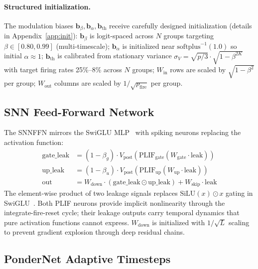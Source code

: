 \documentclass{article}
\newcommand{\vpost}{V_{\text{post}}}
\begin{document}
\paragraph{Structured initialization.}
The modulation biases $\mathbf{b}_\beta, \mathbf{b}_\alpha, \mathbf{b}_{\text{th}}$ receive carefully designed initialization (details in Appendix~\ref{app:init}):
$\mathbf{b}_\beta$ is logit-spaced across $N$ groups targeting $\beta \in [0.80, 0.99]$ (multi-timescale);
$\mathbf{b}_\alpha$ is initialized near $\text{softplus}^{-1}(1.0)$ so initial $\alpha \approx 1$;
$\mathbf{b}_{\text{th}}$ is calibrated from stationary variance $\sigma_V = \sqrt{p/3} \cdot \sqrt{1 - \beta^{2K}}$ with target firing rates 25\%--8\% across $N$ groups;
$W_{\text{in}}$ rows are scaled by $\sqrt{1 - \beta^2}$ per group;
$W_{\text{out}}$ columns are scaled by $1/\sqrt{p_{\text{fire}}}$ per group.

\subsection{SNN Feed-Forward Network}
\label{sec:snn-ffn}

The SNNFFN mirrors the SwiGLU MLP~\citep{touvron2023llama} with spiking neurons replacing the activation function:
\begin{align}
    \text{gate\_leak} &= (1-\beta_g) \cdot \vpost(\text{PLIF}_{\text{gate}}(W_{\text{gate}} \cdot \text{leak})) \label{eq:ffn-gate} \\
    \text{up\_leak} &= (1-\beta_u) \cdot \vpost(\text{PLIF}_{\text{up}}(W_{\text{up}} \cdot \text{leak})) \label{eq:ffn-up} \\
    \text{out} &= W_{\text{down}} \cdot (\text{gate\_leak} \odot \text{up\_leak}) + W_{\text{skip}} \cdot \text{leak} \label{eq:ffn-out}
\end{align}
The element-wise product of two leakage signals replaces $\text{SiLU}(x) \odot x$ gating in SwiGLU~\citep{shazeer2020glu}.
Both PLIF neurons provide implicit nonlinearity through the integrate-fire-reset cycle; their leakage outputs carry temporal dynamics that pure activation functions cannot express.
$W_{\text{down}}$ is initialized with $1/\sqrt{L}$ scaling to prevent gradient explosion through deep residual chains.

\subsection{PonderNet Adaptive Timesteps}
\label{sec:pondernet}
\end{document}
